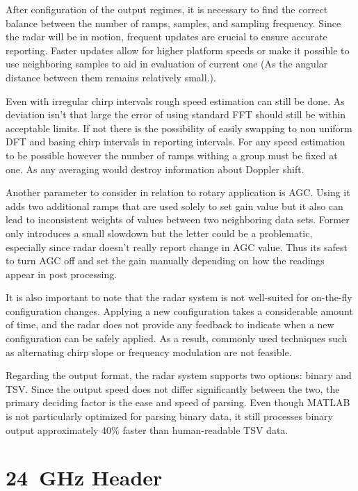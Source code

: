After configuration of the output regimes, it is necessary to find the correct balance between the number of ramps, samples, and sampling frequency.
Since the radar will be in motion, frequent updates are crucial to ensure accurate reporting.
Faster updates allow for higher platform speeds or make it possible to use neighboring samples to aid in evaluation of current one (As the angular distance between them remains relatively small.).

Even with irregular chirp intervals rough speed estimation can still be done.
As deviation isn't that large the error of using standard FFT should still be within acceptable limits.
If not there is the possibility of easily swapping to non uniform DFT and basing chirp intervals in reporting intervals.
For any speed estimation to be possible however the number of ramps withing a group must be fixed at one.
As any averaging would destroy information about Doppler shift.

Another parameter to consider in relation to rotary application is AGC.
Using it adds two additional ramps that are used solely to set gain value but it also can lead to inconsistent weights of values between two neighboring data sets.
Former only introduces a small slowdown but the letter could be a problematic, especially since radar doesn't really report change in AGC value.
Thus its safest to turn AGC off and set the gain manually depending on how the readings appear in post processing.

It is also important to note that the radar system is not well-suited for on-the-fly configuration changes.
Applying a new configuration takes a considerable amount of time, and the radar does not provide any feedback to indicate when a new configuration can be safely applied.
As a result, commonly used techniques such as alternating chirp slope or frequency modulation are not feasible.

Regarding the output format, the radar system supports two options: binary and TSV.
Since the output speed does not differ significantly between the two, the primary deciding factor is the ease and speed of parsing.
Even though MATLAB is not particularly optimized for parsing binary data, it still processes binary output approximately 40\% faster than human-readable TSV data.

\section{24~GHz Header}

